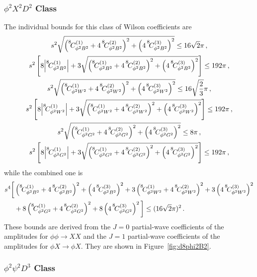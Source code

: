 \subsubsection{$\phi^2 X^2 D^2$ Class\label{par:phi2X2D2}}
The individual bounds for this class of Wilson coefficients are
\begin{gather}\label{eq:PWUB_d8_phi2X2_1}
s^2 \sqrt{\left(\coef{8}{\phi^2 B^2}{(1)}+4\,\coef{8}{\phi^2 B^2}{(2)}\right)^2+\left(4\,\coef{8}{\phi^2 B^2}{(3)}\right)^2} \le 16 \sqrt{2}\pi\,, \\
s^2 \left[8\abs{\coef{8}{\phi^2 B^2}{(1)}}+3\sqrt{\left(\coef{8}{\phi^2 B^2}{(1)}+4\,\coef{8}{\phi^2 B^2}{(2)}\right)^2+\left(4\,\coef{8}{\phi^2 B^2}{(3)}\right)^2}\right]\le 192 \pi\,,
\\
s^2 \sqrt{\left(\coef{8}{\phi^2 W^2}{(1)}+4\,\coef{8}{\phi^2 W^2}{(2)}\right)^2+\left(4\,\coef{8}{\phi^2 W^2}{(3)}\right)^2} \le 16 \sqrt{\frac{2}{3}}\pi\,, 
\\
s^2 \left[8\abs{\coef{8}{\phi^2 W^2}{(1)}}+3\sqrt{\left(\coef{8}{\phi^2 W^2}{(1)}+4\,\coef{8}{\phi^2 W^2}{(2)}\right)^2+\left(4\,\coef{8}{\phi^2 W^2}{(3)}\right)^2}\right]\le 192 \pi\,,
\\
s^2 \sqrt{\left(\coef{8}{\phi^2 G^2}{(1)}+4\,\coef{8}{\phi^2 G^2}{(2)}\right)^2+\left(4\,\coef{8}{\phi^2 G^2}{(3)}\right)^2} \le 8\pi\,,
\\
s^2 \left[8\abs{\coef{8}{\phi^2 G^2}{(1)}}+3\sqrt{\left(\coef{8}{\phi^2 G^2}{(1)}+4\,\coef{8}{\phi^2 G^2}{(2)}\right)^2+\left(4\,\coef{8}{\phi^2 G^2}{(3)}\right)^2}\right]\le 192 \pi\,,
\label{eq:PWUB_d8_phi2X2_2}
\end{gather}
while the combined one is
\begin{align}
    s^4\bigg[&\left(\coef{8}{\phi^2 B^2}{(1)}+4\,\coef{8}{\phi^2 B^2}{(2)}\right)^2+\left(4\,\coef{8}{\phi^2 B^2}{(3)}\right)^2 + 3 \left(\coef{8}{\phi^2 W^2}{(1)}+4\,\coef{8}{\phi^2 W^2}{(2)}\right)^2+3\left(4\,\coef{8}{\phi^2 W^2}{(3)}\right)^2\nonumber \\
    &+ 8\left(\coef{8}{\phi^2 G^2}{(1)}+4\,\coef{8}{\phi^2 G^2}{(2)}\right)^2+8\left(4\,\coef{8}{\phi^2 G^2}{(3)}\right)^2\bigg]\le (16\sqrt{2}\pi)^2\,.
\end{align}
These bounds are derived from the $J=0$ partial-wave coefficients of the amplitudes for $\phi \phi \to XX$ and the $J=1$ partial-wave coefficients of the amplitudes for $\phi X \to \phi X$.
They are shown in Figure~\ref{fig:d8phi2B2}.

\subsubsection{$\phi^2 \psi^2 D^3$ Class\label{par:phi2psi2D3}}

